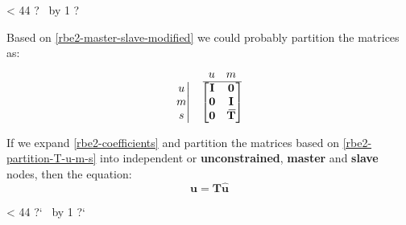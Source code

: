 \documentclass[10pt,b5paper,titlepage]{book}
\newcommand{\m}{\mathbf}
\newcommand{\closure}[2][3]{%
{}\mkern#1mu\overline{\mkern-#1mu#2}}
\newcommand{\repeatit}[3][10]{%
    \myloopcounter1%
    \loop\ifnum\myloopcounter < #1
    #2#3%
    \advance\myloopcounter by 1%
    \repeat%
    #2%
}
\newenvironment{qbox}
{
\begin{center}
    \repeatit[44]{?}{\ }
\end{center}
}
{
\begin{center}
    \repeatit[44]{?`}{\ }
\end{center}
}
\begin{document}
\begin{qbox}
    Based on \eqref{rbe2-master-slave-modified} we could probably partition
    the matrices as:
    \begin{equation}\label{rbe2-partition-T-u-m-s}
        \begin{matrix}
            \begin{matrix}
                \begin{matrix}
                    \ 
                \end{matrix} \\
                \left. \begin{matrix}
                    u \\
                    m \\
                    s \\
                \end{matrix} \right|
            \end{matrix}
            & \begin{matrix}
                \begin{matrix}
                    u & m \\
                    \hline
                \end{matrix} \\
                \begin{bmatrix}
                    \m{I} & \m{0} \\
                    \m{0} & \m{I} \\
                    \m{0} & \m{\closure{T}} \\
                \end{bmatrix} \\
            \end{matrix}
        \end{matrix}
    \end{equation}

    If we expand \eqref{rbe2-coefficients} and partition the matrices
    based on \eqref{rbe2-partition-T-u-m-s} into independent or
    \textbf{unconstrained}, \textbf{master}
    and \textbf{slave} nodes, then the equation:
    \begin{equation}
        \m{u} = \m{T} \m{\hat{u}}
    \end{equation}


\end{qbox}
\end{document}
